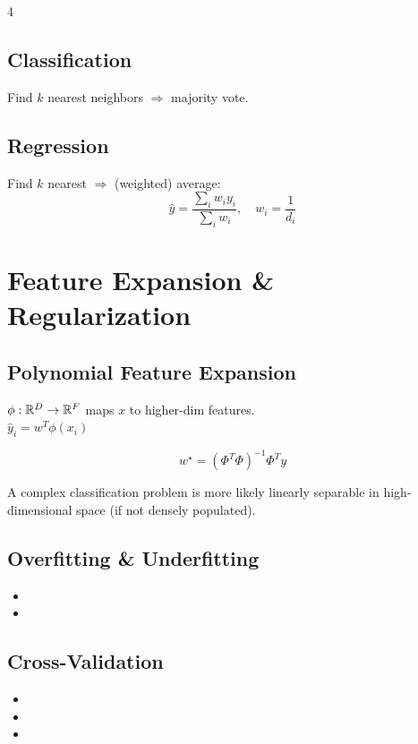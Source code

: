 \documentclass[8pt,a4paper,landscape]{extarticle}
\begin{document}
\begin{multicols*}{4}
\subsection{Classification}
Find $k$ nearest neighbors $\Rightarrow$ majority vote.

\subsection{Regression}
Find $k$ nearest $\Rightarrow$ (weighted) average:
\[ \hat{y} = \frac{\sum_i w_i y_i}{\sum_i w_i}, \quad w_i = \frac{1}{d_i} \]

\section{Feature Expansion \& Regularization}

\subsection{Polynomial Feature Expansion}
\begin{defn}[title=Expansion]
$\phi: \mathbb{R}^D \to \mathbb{R}^F$ maps $x$ to higher-dim features.\\
$\hat{y}_i = w^T\phi(x_i)$
\end{defn}

\begin{thm}[title=Closed-Form with Expansion]
\[ w^\star = (\Phi^T\Phi)^{-1}\Phi^T y \]
\end{thm}

\begin{thm}[title=Cover's Theorem]
A complex classification problem is more likely linearly separable in high-dimensional space (if not densely populated).
\end{thm}

\subsection{Overfitting \& Underfitting}
\begin{itemize}
  \item {}
  \item {}
\end{itemize}

\subsection{Cross-Validation}
\begin{itemize}
  \item {}
  \item {}
  \item {}
\end{itemize}


\end{multicols*}
\end{document}
